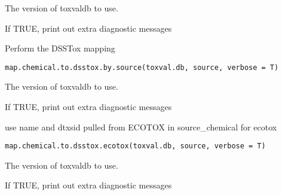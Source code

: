 \documentclass[letterpaper]{book}
\begin{document}
%
\begin{Arguments}
\begin{ldescription}
\item[\code{toxval.db}] The version of toxvaldb to use.

\item[\code{verbose}] If TRUE, print out extra diagnostic messages
\end{ldescription}
\end{Arguments}
%
\begin{Description}\relax
Perform the DSSTox mapping
\end{Description}
%
\begin{Usage}
\begin{verbatim}
map.chemical.to.dsstox.by.source(toxval.db, source, verbose = T)
\end{verbatim}
\end{Usage}
%
\begin{Arguments}
\begin{ldescription}
\item[\code{toxval.db}] The version of toxvaldb to use.

\item[\code{verbose}] If TRUE, print out extra diagnostic messages
\end{ldescription}
\end{Arguments}
%
\begin{Description}\relax
use name and dtxsid pulled from ECOTOX in source\_chemical for ecotox
\end{Description}
%
\begin{Usage}
\begin{verbatim}
map.chemical.to.dsstox.ecotox(toxval.db, source, verbose = T)
\end{verbatim}
\end{Usage}
%
\begin{Arguments}
\begin{ldescription}
\item[\code{toxval.db}] The version of toxvaldb to use.

\item[\code{verbose}] If TRUE, print out extra diagnostic messages
\end{ldescription}
\end{Arguments}
\end{document}
